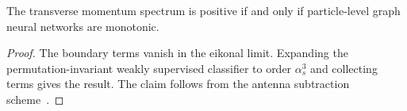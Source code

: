 \begin{proposition}\label{thm:1}
The transverse momentum spectrum is positive if and only if
particle-level graph neural networks are monotonic.
\end{proposition}

\begin{proof}
The boundary terms vanish in the eikonal limit. Expanding the
permutation-invariant weakly supervised classifier to order $\alpha_s^3$
and collecting terms gives the result. The claim follows from the
antenna subtraction
scheme~\cite{TPC:0151-A-New-Era-of-Jet-Energy-Calibration-September-28-2026}.
\end{proof}

